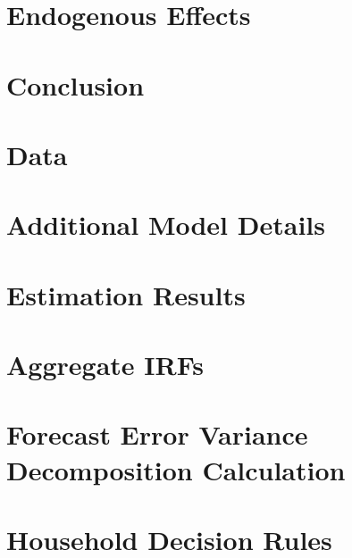 \documentclass[11pt]{article}
\numberwithin{equation}{section} %
\numberwithin{figure}{section} %
\numberwithin{table}{section} %
\begin{document}
\section{Endogenous Effects} \label{sec:endog-eff}


\section{Conclusion} \label{sec:conc}



\newpage
\printbibliography
\FloatBarrier


\newpage
\appendix

\section{Data} \label{app:data}

\FloatBarrier

\section{Additional Model Details} \label{app:mod}

\FloatBarrier

\section{Estimation Results} \label{app:bayes}

\FloatBarrier

\section{Aggregate IRFs} \label{app:agg-irfs}

\FloatBarrier

\section{Forecast Error Variance Decomposition Calculation} \label{app:fevd}

\FloatBarrier

\section{Household Decision Rules} \label{app:dec-rules}

\FloatBarrier
\end{document}

